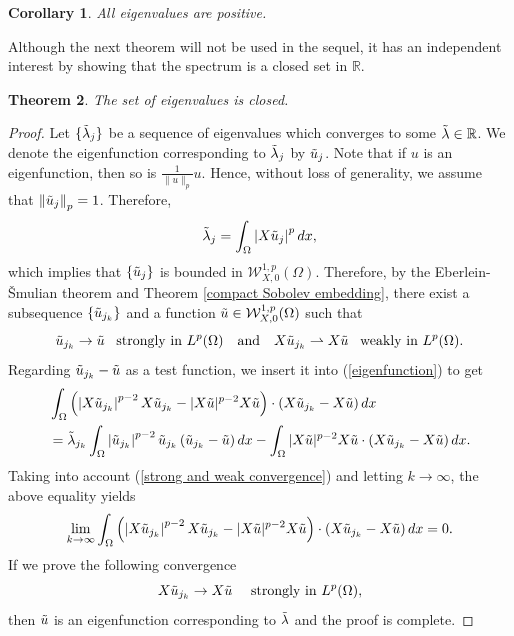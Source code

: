 \documentclass[a4paper,12pt,reqno]{amsart}
\renewcommand\eqref[1]{(\ref{#1})} %
\numberwithin{equation}{section}
\theoremstyle{plain}
\newtheorem{theorem}{Theorem}[section]
\newtheorem{corollary}[theorem]{Corollary}
\theoremstyle{definition}
\begin{document}
\begin{corollary}
All eigenvalues are  positive.    
\end{corollary}
Although the next theorem will not be used in the sequel, it has an independent interest by showing that the spectrum is a closed set in $\mathbb{R}$.
\begin{theorem}\label{closed set}
The set of eigenvalues is closed.
\end{theorem}
\begin{proof} 
Let $\{\Tilde{\lambda}_{j}\}$ be a  sequence of eigenvalues which converges to some $\Tilde{\lambda}\in \mathbb{R}$.  We denote the eigenfunction corresponding to $\Tilde{\lambda}_{j}$  by $\Tilde{u}_{j}$. Note that if $u$ is an eigenfunction, then so is $\frac{1}{\|u\|_{p}}u$. Hence, without loss of generality, we assume that
$\left\|\Tilde{u}_{j}\right\|_{p}=1$. Therefore,
$$
\Tilde{\lambda}_{j}=\int_{\Omega}\left|X\Tilde{u}_{j}\right|^p d x,
$$
which implies that $\{\Tilde{u}_{j}\}$ is bounded in $\mathcal{W}_{X,0}^{1, p}(\Omega)$. Therefore, by the Eberlein-\v{S}mulian theorem  and Theorem \ref{compact Sobolev embedding}, there exist a subsequence $\{\Tilde{u}_{j_{k}}\}$ and a function $\Tilde{u}\in \mathcal{W}_{X,0}^{1, p}(\Omega)$ such that
\begin{equation}\label{strong and weak convergence}
\Tilde{u}_{j_{k}} \to \Tilde{u}\enspace \text{ strongly in } L^{p}(\Omega)\quad\text{and} \quad X \Tilde{u}_{j_{k}} \rightharpoonup  X \Tilde{u} \enspace \text{ weakly in } L^{p}(\Omega). 
\end{equation}
Regarding $\Tilde{u}_{j_{k}}-\Tilde{u}$ as a test function, we insert it into \eqref{eigenfunction} to get
\begin{equation*}
\begin{aligned}
&\int_{\Omega}\left(\left|X \Tilde{u}_{j_{k}}\right|^{p-2} X \Tilde{u}_{j_{k}}-|X \Tilde{u}|^{p-2} X \Tilde{u}\right) \cdot \left(X\Tilde{u}_{j_{k}}-X \Tilde{u}\right) d x \\
&=\Tilde{\lambda}_{j_{k}} \int_{\Omega}\left|\Tilde{u}_{j_{k}}\right|^{p-2} \Tilde{u}_{j_{k}}\left(\Tilde{u}_{j_{k}}-\Tilde{u}\right) d x-\int_{\Omega}|X \Tilde{u}|^{p-2} X \Tilde{u} \cdot\left(X \Tilde{u}_{j_{k}}-X \Tilde{u}\right) d x .
\end{aligned}
\end{equation*}
Taking into account \eqref{strong and weak convergence} and letting $k\to \infty$, the above equality yields 
\begin{equation}\label{closed set: limit}
\lim _{k \rightarrow \infty} \int_{\Omega}\left(\left|X \Tilde{u}_{j_{k}}\right|^{p-2} X \Tilde{u}_{j_{k}}-|X \Tilde{u}|^{p-2} X \Tilde{u}\right) \cdot\left(X \Tilde{u}_{j_{k}}-X \Tilde{u}\right) d x=0 .
\end{equation}
If we prove the following convergence
\begin{equation}\label{closed set: strong convergence of the horizontal gradient}
X \Tilde{u}_{j_{k}} \to  X \Tilde{u}\quad \text{ strongly in } L^{p}(\Omega), 
\end{equation}
then $\Tilde{u}$ is an eigenfunction corresponding to $\Tilde{\lambda}$ and the proof is complete. 


\end{proof}
\end{document}
